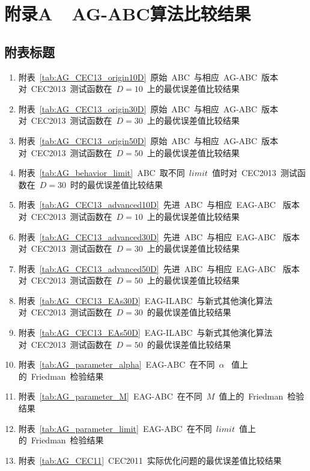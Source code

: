 


\chapter*{附录A~~AG-ABC算法比较结果}
\section*{附表标题}
\begin{enumerate}
\item 附表~\ref{tab:AG_CEC13_origin10D}~原始~ABC~与相应~AG-ABC~版本对~CEC2013~测试函数在~$D=10$~上的最优误差值比较结果
\item 附表~\ref{tab:AG_CEC13_origin30D}~原始~ABC~与相应~AG-ABC~版本对~CEC2013~测试函数在~$D=30$~上的最优误差值比较结果
\item 附表~\ref{tab:AG_CEC13_origin50D}~原始~ABC~与相应~AG-ABC~版本对~CEC2013~测试函数在~$D=50$~上的最优误差值比较结果
\item 附表~\ref{tab:AG_behavior_limit}~ABC~取不同~$limit$~值时对~CEC2013~测试函数在~$D=30$~时的最优误差值比较结果
\item 附表~\ref{tab:AG_CEC13_advanced10D}~先进~ABC~与相应~EAG-ABC~ 版本对~CEC2013~测试函数在~$D=10$~上的最优误差值比较结果
\item 附表~\ref{tab:AG_CEC13_advanced30D}~先进~ABC~与相应~EAG-ABC~ 版本对~CEC2013~测试函数在~$D=30$~上的最优误差值比较结果
\item 附表~\ref{tab:AG_CEC13_advanced50D}~先进~ABC~与相应~EAG-ABC~ 版本对~CEC2013~测试函数在~$D=50$~上的最优误差值比较结果
\item 附表~\ref{tab:AG_CEC13_EAs30D}~EAG-ILABC~与新式其他演化算法对~CEC2013~测试函数在~$D=30$~的最优误差值比较结果
\item 附表~\ref{tab:AG_CEC13_EAs50D}~EAG-ILABC~与新式其他演化算法对~CEC2013~测试函数在~$D=50$~的最优误差值比较结果
\item 附表~\ref{tab:AG_parameter_alpha}~EAG-ABC~在不同~$\alpha$~ 值上的~Friedman~检验结果
\item 附表~\ref{tab:AG_parameter_M}~EAG-ABC~在不同~$M$~值上的~Friedman~检验结果
\item 附表~\ref{tab:AG_parameter_limit}~EAG-ABC~在不同~$limit$~值上的~Friedman~检验结果
\item 附表~\ref{tab:AG_CEC11}~CEC2011~实际优化问题的最优误差值比较结果
\end{enumerate}

